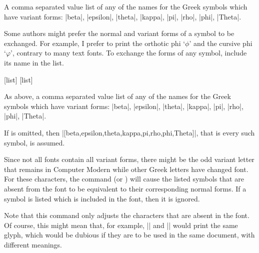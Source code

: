 \documentclass{ltxdockit}
\begin{document}
\begin{ltxsyntax}

  \begin{marglist}

  \item[\prm{list}] A comma separated value list of any of the names
    for the Greek symbols which have variant forms: |beta|, |epsilon|,
    |theta|, |kappa|, |pi|, |rho|, |phi|, |Theta|.

  \end{marglist}

  Some authors might prefer the normal and variant forms of a symbol
  to be exchanged. For example, I prefer  to print the
  orthotic phi ‘$\phi$’ and  the cursive phi ‘$\varphi$’,
  contrary to many text fonts. To exchange the forms of any symbol,
  include its name in the list.

  [list] [list]

  \begin{marglist}

  \item[\prm{list}] As above, a comma separated value list of any of
    the names for the Greek symbols which have variant forms: |beta|,
    |epsilon|, |theta|, |kappa|, |pi|, |rho|, |phi|, |Theta|.

    If  is omitted, then
    |[beta,epsilon,theta,kappa,pi,rho,phi,Theta]|, that is every such
    symbol, is assumed.

  \end{marglist}

  Since not all fonts contain all variant forms, there might be the
  odd variant letter that remains in Computer Modern while other Greek
  letters have changed font. For these characters, the command
   (or ) will cause the
  listed symbols that are absent from the font to be equivalent to
  their corresponding normal forms. If a symbol is listed which is
  included in the font, then it is ignored.

  Note that this command only adjusts the characters that are absent
  in the font. Of course, this might mean that, for example,
  |\vartheta| and |\theta| would print the same glyph, which would be
  dubious if they are to be used in the same document, with different
  meanings.

\end{ltxsyntax}
\end{document}

